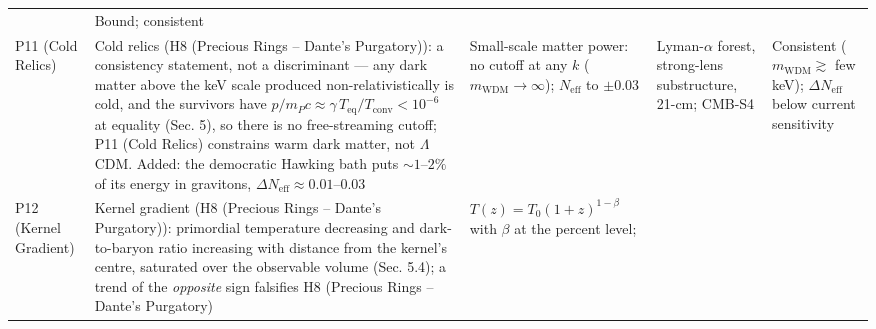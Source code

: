 \documentclass[
  11pt,
]{article}
\begin{document}
\begin{longtable}[]{@{}lllll@{}}
\begin{minipage}[t]{0.19\columnwidth}
\end{minipage} & \begin{minipage}[t]{0.19\columnwidth}\raggedright
Bound; consistent\strut
\end{minipage}\tabularnewline
\begin{minipage}[t]{0.11\columnwidth}\raggedright
P11 (Cold Relics)\strut
\end{minipage} & \begin{minipage}[t]{0.19\columnwidth}\raggedright
Cold relics (H8 (Precious Rings -- Dante's Purgatory)): a consistency
statement, not a discriminant --- any dark matter above the keV scale
produced non-relativistically is cold, and the survivors have
\(p/m_Pc \approx \gamma\,T_{\text{eq}}/T_{\text{conv}} < 10^{-6}\) at
equality (Sec. 5), so there is no free-streaming cutoff; P11 (Cold
Relics) constrains warm dark matter, not \(\Lambda\)CDM. Added: the
democratic Hawking bath puts \(\sim\!1\)--\(2\%\) of its energy in
gravitons, \(\Delta N_{\text{eff}} \approx 0.01\)--\(0.03\)\strut
\end{minipage} & \begin{minipage}[t]{0.19\columnwidth}\raggedright
Small-scale matter power: no cutoff at any \(k\)
(\(m_{\text{WDM}} \to \infty\)); \(N_{\text{eff}}\) to
\(\pm 0.03\)\strut
\end{minipage} & \begin{minipage}[t]{0.19\columnwidth}\raggedright
Lyman-\(\alpha\) forest, strong-lens substructure, 21-cm; CMB-S4\strut
\end{minipage} & \begin{minipage}[t]{0.19\columnwidth}\raggedright
Consistent (\(m_{\text{WDM}} \gtrsim\) few keV);
\(\Delta N_{\text{eff}}\) below current sensitivity\strut
\end{minipage}\tabularnewline
\begin{minipage}[t]{0.11\columnwidth}\raggedright
P12 (Kernel Gradient)\strut
\end{minipage} & \begin{minipage}[t]{0.19\columnwidth}\raggedright
Kernel gradient (H8 (Precious Rings -- Dante's Purgatory)): primordial
temperature decreasing and dark-to-baryon ratio increasing with distance
from the kernel's centre, saturated over the observable volume (Sec.
5.4); a trend of the \emph{opposite} sign falsifies H8 (Precious Rings
-- Dante's Purgatory)\strut
\end{minipage} & \begin{minipage}[t]{0.19\columnwidth}\raggedright
\(T(z) = T_0(1+z)^{1-\beta}\) with \(\beta\) at the percent level;

\end{minipage}
\end{longtable}
\end{document}
